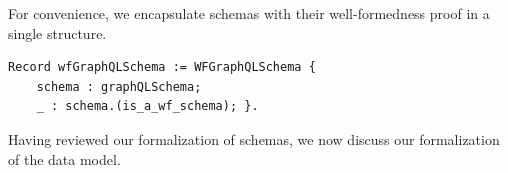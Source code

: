 For convenience, we encapsulate schemas with their well-formedness
proof in a single structure. 

%

\begin{verbatim}
Record wfGraphQLSchema := WFGraphQLSchema {
    schema : graphQLSchema;
    _ : schema.(is_a_wf_schema); }.
\end{verbatim}





Having reviewed our formalization of schemas, we now discuss our formalization of the data model. 



